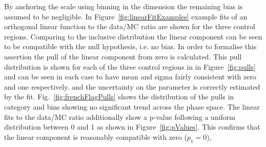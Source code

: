 By anchoring the scale using binning in the \scalht dimension the remaining
bias is assumed to be negligible. In Figure~\ref{fig:linearFitExamples} 
example fits of an orthogonal linear function to the data/MC ratio 
are shown for the three control regions. Comparing to the inclusive distribution 
the linear component can be seen to be compatible with the null hypothesis, 
i.e. no bias. In order to formalise this assertion 
the pull of the linear component from zero is calculated.
This pull distribution is shown for each of the three control regions in
in Figure~\ref{fig:pulls} and can be seen in each case to have mean and sigma fairly 
consistent with zero and one respectively. 
and the uncertainty on the parameter is correctly estimated by the fit.
Fig.~\ref{fig:frenchFlagPulls} shows the distribution of the pulls 
in category and \scalht bins showing no significant trend across the phase space.
The linear fits to the data/MC ratio additionally show a p-value following 
a uniform distribution between 0 and 1 as shown in Figure~\ref{fig:pValues}.
This confirms that the linear component is reasonably compatible with zero ($p_1 = 0$), %



